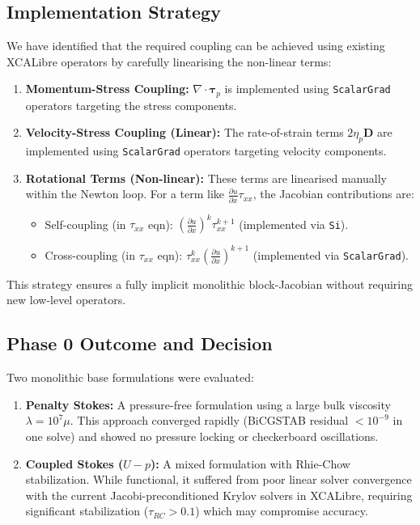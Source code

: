 \subsection{Implementation Strategy}
We have identified that the required coupling can be achieved using existing XCALibre operators by carefully linearising the non-linear terms:
\begin{enumerate}
    \item \textbf{Momentum-Stress Coupling:} $\nabla \cdot \boldsymbol{\tau}_p$ is implemented using \texttt{ScalarGrad} operators targeting the stress components.
    \item \textbf{Velocity-Stress Coupling (Linear):} The rate-of-strain terms $2 \eta_p \mathbf{D}$ are implemented using \texttt{ScalarGrad} operators targeting velocity components.
    \item \textbf{Rotational Terms (Non-linear):} These terms are linearised manually within the Newton loop. For a term like $\frac{\partial u}{\partial x} \tau_{xx}$, the Jacobian contributions are:
    \begin{itemize}
        \item Self-coupling (in $\tau_{xx}$ eqn): $\left(\frac{\partial u}{\partial x}\right)^k \tau_{xx}^{k+1}$ (implemented via \texttt{Si}).
        \item Cross-coupling (in $\tau_{xx}$ eqn): $\tau_{xx}^k \left(\frac{\partial u}{\partial x}\right)^{k+1}$ (implemented via \texttt{ScalarGrad}).
    \end{itemize}
\end{enumerate}
This strategy ensures a fully implicit monolithic block-Jacobian without requiring new low-level operators.

\subsection{Phase 0 Outcome and Decision}
Two monolithic base formulations were evaluated:
\begin{enumerate}
    \item \textbf{Penalty Stokes:} A pressure-free formulation using a large bulk viscosity $\lambda = 10^7 \mu$. This approach converged rapidly (BiCGSTAB residual $< 10^{-9}$ in one solve) and showed no pressure locking or checkerboard oscillations.
    \item \textbf{Coupled Stokes ($U-p$):} A mixed formulation with Rhie-Chow stabilization. While functional, it suffered from poor linear solver convergence with the current Jacobi-preconditioned Krylov solvers in XCALibre, requiring significant stabilization ($\tau_{RC} > 0.1$) which may compromise accuracy.
\end{enumerate}

